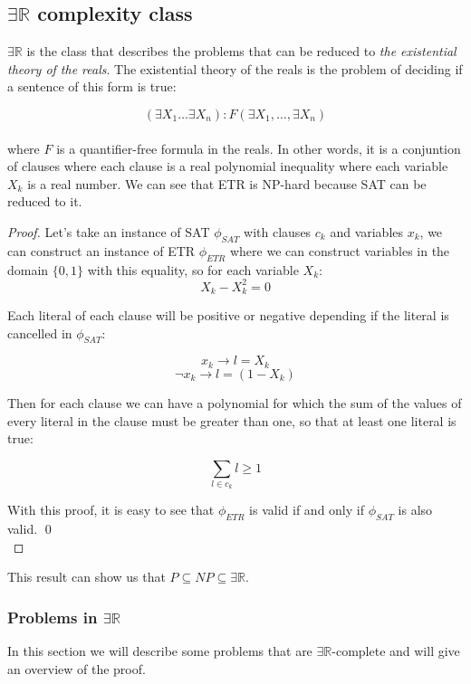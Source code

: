 \subsection{$\exists \mathbb{R}$ complexity class}

$\exists \mathbb{R}$ is the class that describes the problems that can be reduced to
\textit{the existential theory of the reals}\cite{ExistentialTheoryReals2006a}. The
existential theory of the reals is the problem of deciding if a sentence of this form
is true:

$$(\exists X_1 \dots \exists X_n): F(\exists X_1, \dots,\exists X_n)$$\\

where $F$ is a quantifier-free formula in the reals. In other words, it is a
conjuntion of clauses where each clause is a real polynomial inequality where
each variable $X_k$ is a real number. We can see that ETR is NP-hard because
SAT can be reduced to it.


\begin{proof}
  Let's take an instance of SAT $\phi_{SAT}$ with clauses $c_k$ and variables
  $x_k$, we can construct an instance of ETR $\phi_{ETR}$ where we can
  construct variables in the domain $\{0,1\}$ with this equality, so for each
  variable $X_k$:
  $$X_k - X_k^2 = 0$$

  Each literal of each clause will be positive or negative depending if the literal is cancelled in $\phi_{SAT}$:

  $$x_k \to l = X_k$$
  $$\neg x_k \to l = (1-X_k)$$

  Then for each clause we can have a polynomial for which the sum of the values of every
  literal in the clause must be greater than one, so that at least one literal is true:

  $$\sum_{l\in c_k} l \geq 1$$

  With this proof, it is easy to see that $\phi_{ETR}$ is valid if and only if $\phi_{SAT}$ is also valid.  \qed\\

\end{proof}

This result can show us that $P \subseteq NP \subseteq \exists \mathbb{R}$.

\subsubsection{Problems in $\exists \mathbb{R}$}

In this section we will describe some problems that are $\exists
\mathbb{R}$-complete and will give an overview of the proof.

